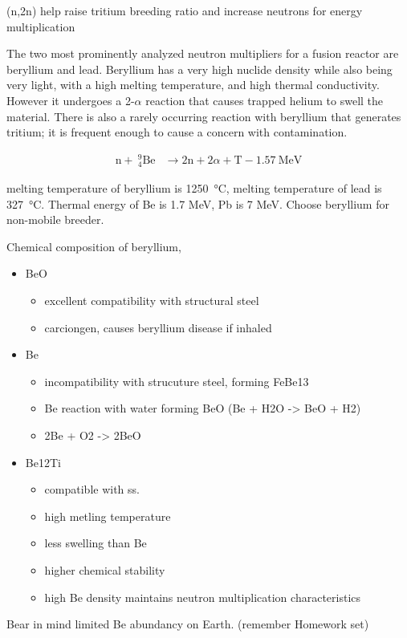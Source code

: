 \documentclass[11pt]{report} %
\begin{document}
(n,2n) help raise tritium breeding ratio and increase neutrons for energy multiplication

The two most prominently analyzed neutron multipliers for a fusion reactor are beryllium and lead. Beryllium has a very high nuclide density while also being very light, with a high melting temperature, and high thermal conductivity. However it undergoes a 2-$\alpha$ reaction that causes trapped helium to swell the material. There is also a rarely occurring reaction with beryllium that generates tritium; it is frequent enough to cause a concern with contamination.

\begin{align}
\mathrm{n} + ~^9_4\mathrm{Be} &\xrightarrow ~2\mathrm{n}+2\alpha + \mathrm{T} -1.57~\text{MeV}\label{eq:Be-n}
\end{align}

melting temperature of beryllium is \SI{1250}{\celsius}, melting temperature of lead is \SI{327}{\celsius}. Thermal energy of Be is 1.7 MeV, Pb is 7 MeV. Choose beryllium for non-mobile breeder.

Chemical composition of beryllium,
\begin{itemize}
\item{BeO}
\begin{itemize}
\item{excellent compatibility with structural steel}
\item{carciongen, causes beryllium disease if inhaled}
\end{itemize}
\item{Be}
\begin{itemize}
\item{incompatibility with strucuture steel, forming FeBe13}
\item{Be reaction with water forming BeO (Be + H2O -> BeO + H2)}
\item{2Be + O2 -> 2BeO}
\end{itemize}
\item{Be12Ti}
\begin{itemize}
\item{compatible with ss.}
\item{high metling temperature}
\item{less swelling than Be}
\item{higher chemical stability}
\item{high Be density maintains neutron multiplication characteristics}
\end{itemize}
\end{itemize}
Bear in mind limited Be abundancy on Earth. (remember Homework set)
\end{document}
